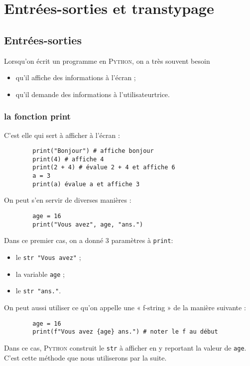 \chapter{Entrées-sorties et transtypage}

\section{Entrées-sorties}

Lorsqu'on écrit un programme en \textsc{Python}, on a très souvent besoin
\begin{itemize}
    \item qu'il affiche des informations à l'écran ;
    \item qu'il demande des informations à l'utilisateur\cdot trice.
\end{itemize}

\subsection{la fonction print}

C'est elle qui sert à afficher à l'écran :

\begin{pyc}
    \begin{verbatim}
        print("Bonjour") # affiche bonjour
        print(4) # affiche 4
        print(2 + 4) # évalue 2 + 4 et affiche 6
        a = 3
        print(a) évalue a et affiche 3
    \end{verbatim}
\end{pyc}

On peut s'en servir de diverses manières :
\begin{pyc}
    \begin{verbatim}
        age = 16
        print("Vous avez", age, "ans.")
    \end{verbatim}
\end{pyc}
Dans ce premier cas, on a donné 3 paramètres à \texttt{print}:
\begin{itemize}
    \item le \texttt{str "Vous avez"} ;
    \item la variable \texttt{age} ;
    \item  le \texttt{str "ans."}.
\end{itemize}
On peut aussi utiliser ce qu'on appelle une « f-string » de la manière suivante :
\begin{pyc}
    \begin{verbatim}
        age = 16
        print(f"Vous avez {age} ans.") # noter le f au début
    \end{verbatim}
\end{pyc}
Dans ce cas, \textsc{Python} construit le \texttt{str} à afficher en y reportant la valeur de \texttt{age}.\\
C'est cette méthode que nous utiliserons par la suite.\\

